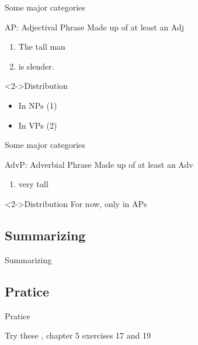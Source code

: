 \documentclass{beamer}
\newcommand{\subonetwo}{Some major categories}
\newcommand{\subonethree}{Summarizing}
\newcommand{\subonefour}{Pratice}
\begin{document}
      \begin{frame}{\subonetwo}
        \begin{block}{AP: Adjectival Phrase}
          Made up of at least an Adj
        \end{block}
        \begin{example}
          \begin{enumerate}
            \item \only<2->{[NP }The \only<2->{[AP }tall\only<2->{]} man\only<2->{]}
            \item \only<3->{[VP }is \only<3->{[AP }slender\only<3->{]}.\only<3->{]}
          \end{enumerate}
        \end{example}
        \begin{block}<2->{Distribution}
          \begin{itemize}
            \item<2-> In NPs (1)
            \item<3-> In VPs (2)
          \end{itemize}
        \end{block}
      \end{frame}

      \begin{frame}{\subonetwo}
        \begin{block}{AdvP: Adverbial Phrase}
          Made up of at least an Adv
        \end{block}
        \begin{example}
          \begin{enumerate}
            \item \only<2->{[AP [AdvP }very\only<2->{]} tall\only<2->{]}
          \end{enumerate}
        \end{example}
        \begin{block}<2->{Distribution}
          For now, only in APs
        \end{block}
      \end{frame}

    \subsection{\subonethree}
      \begin{frame}{\subonethree}
        \small
          
      \end{frame}

    \subsection{\subonefour}
      \begin{frame}{\subonefour}
        \begin{block}{Try these}
          \textcite{dawson_language_2016}, chapter 5 exercises 17 and 19
        \end{block}
      \end{frame}
\end{document}
